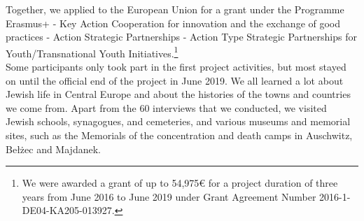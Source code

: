 Together, we applied to the European Union for a grant under the Programme Erasmus+ - Key Action Cooperation for innovation and the exchange of good practices - Action Strategic Partnerships - Action Type Strategic Partnerships for Youth/Transnational Youth Initiatives.\footnote{We were awarded a grant of up to 54,975\euro{} for a project duration of three years from June 2016 to June 2019 under Grant Agreement Number 2016-1-DE04-KA205-013927.} \\
Some participants only took part in the first project activities, but most stayed on until the official end of the project in June 2019. We all learned a lot about Jewish life in Central Europe and about the histories of the towns and countries we come from. Apart from the 60 interviews that we conducted, we visited Jewish schools, synagogues, and cemeteries, and various museums and memorial sites, such as the Memorials of the concentration and death camps in Auschwitz, Bełżec and Majdanek. 
